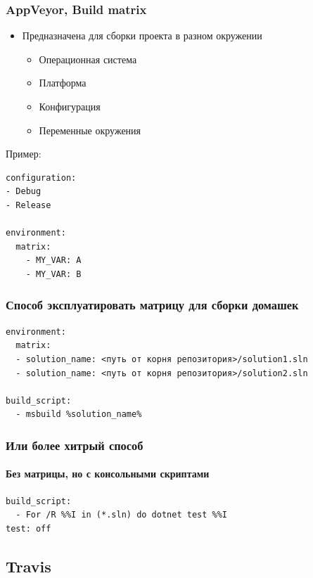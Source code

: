 \documentclass[xetex,mathserif,serif]{beamer}
\begin{document}
    \begin{frame}[fragile]
        \frametitle{AppVeyor, Build matrix}
        \begin{itemize}
            \item Предназначена для сборки проекта в разном окружении
            \begin{itemize}
                \item Операционная система
                \item Платформа
                \item Конфигурация
                \item Переменные окружения
            \end{itemize}
        \end{itemize}
        Пример:
        \begin{verbatim}
configuration:
- Debug
- Release

environment:
  matrix:
    - MY_VAR: A
    - MY_VAR: B
        \end{verbatim}
    \end{frame}

    \begin{frame}[fragile]
        \frametitle{Способ эксплуатировать матрицу для сборки домашек}
        \begin{verbatim}
environment:
  matrix:
  - solution_name: <путь от корня репозитория>/solution1.sln
  - solution_name: <путь от корня репозитория>/solution2.sln

build_script:
  - msbuild %solution_name%
        \end{verbatim}
    \end{frame}

    \begin{frame}[fragile]
        \frametitle{Или более хитрый способ}
        \framesubtitle{Без матрицы, но с консольными скриптами}
        \begin{verbatim}
build_script:
  - For /R %%I in (*.sln) do dotnet test %%I
test: off
        \end{verbatim}
    \end{frame}

    \subsection{Travis}
\end{document}
